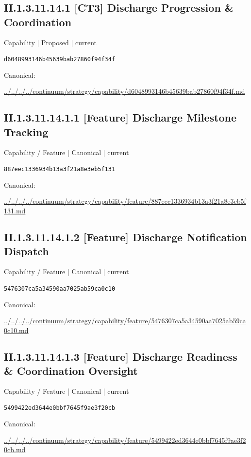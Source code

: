 \documentclass[10pt,a4paper]{article}
\begin{document}
\subsection*{II.1.3.11.14.1 [CT3] Discharge Progression \& Coordination}
{\small Capability | Proposed | current}\par
\texttt{d6048993146b45639bab27860f94f34f}\par
Canonical: \par
{\footnotesize\url{../../../../continuum/strategy/capability/d6048993146b45639bab27860f94f34f.md}}\par
\subsection*{II.1.3.11.14.1.1 [Feature] Discharge Milestone Tracking}
{\small Capability / Feature | Canonical | current}\par
\texttt{887eec1336934b13a3f21a8e3eb5f131}\par
Canonical: \par
{\footnotesize\url{../../../../continuum/strategy/capability/feature/887eec1336934b13a3f21a8e3eb5f131.md}}\par
\subsection*{II.1.3.11.14.1.2 [Feature] Discharge Notification Dispatch}
{\small Capability / Feature | Canonical | current}\par
\texttt{5476307ca5a34590aa7025ab59ca0c10}\par
Canonical: \par
{\footnotesize\url{../../../../continuum/strategy/capability/feature/5476307ca5a34590aa7025ab59ca0c10.md}}\par
\subsection*{II.1.3.11.14.1.3 [Feature] Discharge Readiness \& Coordination Oversight}
{\small Capability / Feature | Canonical | current}\par
\texttt{5499422ed3644e0bbf7645f9ae3f20cb}\par
Canonical: \par
{\footnotesize\url{../../../../continuum/strategy/capability/feature/5499422ed3644e0bbf7645f9ae3f20cb.md}}\par
\end{document}
